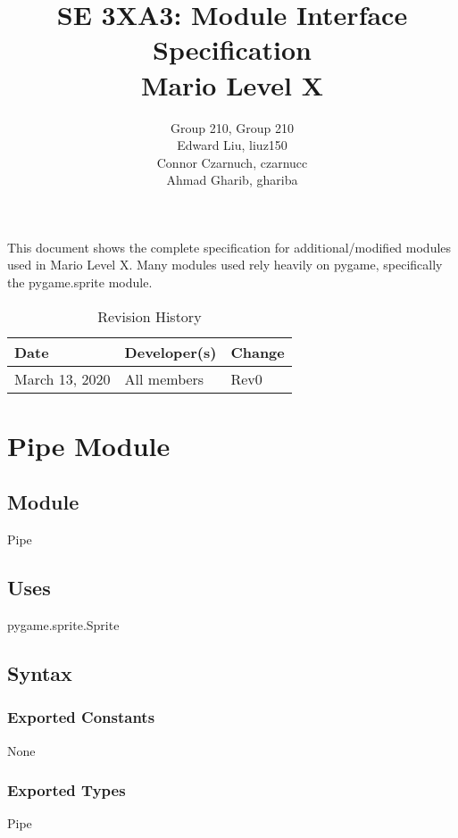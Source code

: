 \documentclass[12pt]{article}
\title{SE 3XA3: Module Interface Specification\\Mario Level X}
\author{Group 210, Group 210
		\\ Edward Liu, liuz150
		\\ Connor Czarnuch, czarnucc
		\\ Ahmad Gharib, ghariba
}
\begin{document}
 
\maketitle

\noindent This document shows the complete specification for additional/modified modules used in Mario Level X. Many modules used rely heavily on pygame, specifically the pygame.sprite module.

\begin{table}[hp]
\caption{Revision History} \label{TblRevisionHistory}
\begin{tabularx}{\textwidth}{llX}
\toprule
\textbf{Date} & \textbf{Developer(s)} & \textbf{Change}\\
\midrule
March 13, 2020 & All members & Rev0\\
\bottomrule
\end{tabularx}
\end{table}

\newpage

\section* {Pipe Module}

\subsection*{Module}

Pipe

\subsection* {Uses}

pygame.sprite.Sprite

\subsection* {Syntax}

\subsubsection* {Exported Constants}

None

\subsubsection* {Exported Types}

Pipe
\end{document}
